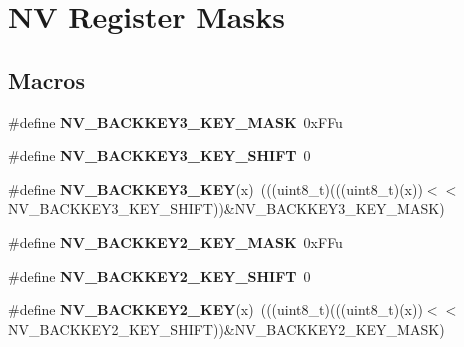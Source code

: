 \hypertarget{group__NV__Register__Masks}{}\section{NV Register Masks}
\label{group__NV__Register__Masks}
\subsection*{Macros}
\begin{DoxyCompactItemize}
\item 
\#define {\bfseries N\+V\+\_\+\+B\+A\+C\+K\+K\+E\+Y3\+\_\+\+K\+E\+Y\+\_\+\+M\+A\+SK}~0x\+F\+Fu\hypertarget{group__NV__Register__Masks_gabe9123bc8137627b30e4f75c757cfb95}{}\label{group__NV__Register__Masks_gabe9123bc8137627b30e4f75c757cfb95}

\item 
\#define {\bfseries N\+V\+\_\+\+B\+A\+C\+K\+K\+E\+Y3\+\_\+\+K\+E\+Y\+\_\+\+S\+H\+I\+FT}~0\hypertarget{group__NV__Register__Masks_ga78b75e37d984596ddd9053d2125a78ff}{}\label{group__NV__Register__Masks_ga78b75e37d984596ddd9053d2125a78ff}

\item 
\#define {\bfseries N\+V\+\_\+\+B\+A\+C\+K\+K\+E\+Y3\+\_\+\+K\+EY}(x)~(((uint8\+\_\+t)(((uint8\+\_\+t)(x))$<$$<$N\+V\+\_\+\+B\+A\+C\+K\+K\+E\+Y3\+\_\+\+K\+E\+Y\+\_\+\+S\+H\+I\+FT))\&N\+V\+\_\+\+B\+A\+C\+K\+K\+E\+Y3\+\_\+\+K\+E\+Y\+\_\+\+M\+A\+SK)\hypertarget{group__NV__Register__Masks_ga2fa5913563629cd7c8b509cc87421687}{}\label{group__NV__Register__Masks_ga2fa5913563629cd7c8b509cc87421687}

\item 
\#define {\bfseries N\+V\+\_\+\+B\+A\+C\+K\+K\+E\+Y2\+\_\+\+K\+E\+Y\+\_\+\+M\+A\+SK}~0x\+F\+Fu\hypertarget{group__NV__Register__Masks_ga5bf8822b0b59a321d9b5c30eb1618704}{}\label{group__NV__Register__Masks_ga5bf8822b0b59a321d9b5c30eb1618704}

\item 
\#define {\bfseries N\+V\+\_\+\+B\+A\+C\+K\+K\+E\+Y2\+\_\+\+K\+E\+Y\+\_\+\+S\+H\+I\+FT}~0\hypertarget{group__NV__Register__Masks_ga408b1083508e784cba76d5be9b147a84}{}\label{group__NV__Register__Masks_ga408b1083508e784cba76d5be9b147a84}

\item 
\#define {\bfseries N\+V\+\_\+\+B\+A\+C\+K\+K\+E\+Y2\+\_\+\+K\+EY}(x)~(((uint8\+\_\+t)(((uint8\+\_\+t)(x))$<$$<$N\+V\+\_\+\+B\+A\+C\+K\+K\+E\+Y2\+\_\+\+K\+E\+Y\+\_\+\+S\+H\+I\+FT))\&N\+V\+\_\+\+B\+A\+C\+K\+K\+E\+Y2\+\_\+\+K\+E\+Y\+\_\+\+M\+A\+SK)\hypertarget{group__NV__Register__Masks_gaca7b47cbaa596b76f92f926f40dcc80a}{}\label{group__NV__Register__Masks_gaca7b47cbaa596b76f92f926f40dcc80a}


\end{DoxyCompactItemize}
